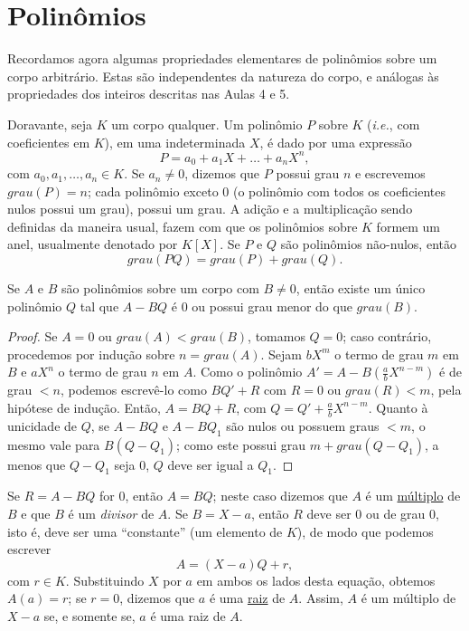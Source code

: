 \section{Polinômios}

Recordamos agora algumas propriedades elementares de polinômios sobre um corpo arbitrário. 
Estas são independentes da natureza do corpo, e análogas às propriedades dos inteiros 
descritas nas Aulas 4 e 5.

Doravante, seja $K$ um corpo qualquer. 
Um polinômio $P$ sobre $K$ (\textit{i.e.}, com coeficientes em $K$), em uma indeterminada $X$, 
é dado por uma expressão
\[
P = a_0 + a_1 X + \ldots + a_n X^n,
\]
com $a_0, a_1, \ldots, a_n \in K$. 
Se $a_n \neq 0$, dizemos que $P$ possui grau $n$ e escrevemos $grau(P) = n$; 
cada polinômio exceto 0 (o polinômio com todos os coeficientes nulos possui um grau), possui um grau. 
A adição e a multiplicação sendo definidas da maneira usual, fazem com que os polinômios 
sobre $K$ formem um anel, usualmente denotado por $K[X]$. 
Se $P$ e $Q$ são polinômios não-nulos, então
\[
grau(PQ) = grau(P) + grau(Q).
\]

\begin{lema}
Se $A$ e $B$ são polinômios sobre um corpo com $B \neq 0$, então existe um único polinômio $Q$ 
tal que $A - BQ$ é $0$ ou possui grau menor do que $grau(B)$.    
\end{lema}

\begin{proof}
Se $A = 0$ ou $grau(A) < grau(B)$, tomamos $Q = 0$; caso contrário, procedemos por indução 
sobre $n = grau(A)$. 
Sejam $bX^m$ o termo de grau $m$ em $B$ e $aX^n$ o termo de grau $n$ em $A$. 
Como o polinômio $A' = A - B\left(\frac{a}{b} X^{n-m}\right)$
é de grau $< n$, podemos escrevê-lo como $BQ' + R$ com $R = 0$ ou $grau(R) < m$, 
pela hipótese de indução. 
Então, $A = BQ + R$, com $Q = Q' + \frac{a}{b} X^{n-m}$.
Quanto à unicidade de $Q$, se $A - BQ$ e $ A - BQ_1$
são nulos ou possuem graus $< m$, o mesmo vale para $B(Q - Q_1)$; 
como este possui grau $m + grau(Q - Q_1)$, a menos que $Q - Q_1$ seja 0,
$Q$ deve ser igual a $Q_1$. 
\end{proof}

Se $R = A - BQ$ for $0$, então $A = BQ$; neste caso dizemos que $A$ é um 
\underline{múltiplo} de $B$ e que $B$ é um \emph{divisor} de $A$. 
Se $B = X - a$, então $R$ deve ser $0$ ou de grau $0$, isto é, deve ser uma 
``constante'' (um elemento de $K$), de modo que podemos escrever
\[
A = (X - a)Q + r,
\]
com $r \in K$. Substituindo $X$ por $a$ em ambos os lados desta equação, obtemos
$A(a) = r$; se $r = 0$, dizemos que $a$ é uma \underline{raiz} de $A$. Assim, $A$ é um múltiplo de 
$X - a$ se, e somente se, $a$ é uma raiz de $A$.

